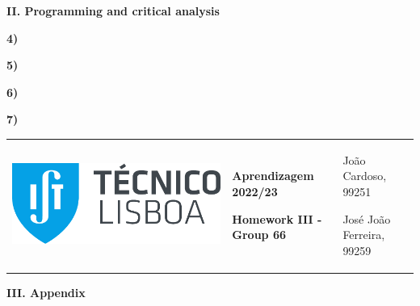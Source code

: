\documentclass[11pt,a4paper]{article}
\begin{document}
\begin{center}
\textbf{II. Programming and critical analysis}
\end{center}

\begin{flushleft}
\textbf{4)} \par
\begin{center}
\end{center}
\end{flushleft}

\begin{flushleft}
\textbf{5)}
\end{flushleft}

\begin{flushleft}
\textbf{6)}
\end{flushleft}

\begin{flushleft}
\textbf{7)}
\end{flushleft}

\pagebreak
\hspace{-8.25mm}
\color{darkgray}
\renewcommand\tabularxcolumn[1]{m{#1}}
\begin{tabularx}{1.09\textwidth} {>{\raggedright\arraybackslash}X >{\centering\arraybackslash}X >{\raggedleft\arraybackslash}X}
  \includegraphics[scale=0.2]{tecnico.pdf} &
  \textbf{Aprendizagem 2022/23} \par \textbf{Homework III - Group 66} &
  João Cardoso, 99251 \par José João Ferreira, 99259
\end{tabularx}
\renewcommand\tabularxcolumn[1]{p{#1}}
\color{black}

\begin{center}
\textbf{III. Appendix}
\end{center}

\end{document}
